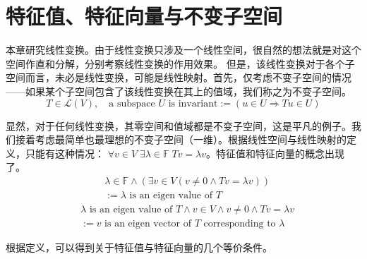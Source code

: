 \documentclass{tufte-book}
\begin{document}
\chapter{特征值、特征向量与不变子空间}
本章研究线性变换。由于线性变换只涉及一个线性空间，很自然的想法就是对这个空间作直和分解，分别考察线性变换的作用效果。
但是，该线性变换对于各个子空间而言，未必是线性变换，可能是线性映射。首先，仅考虑不变子空间的情况——如果某个子空间包含了该线性变换在其上的值域，我们称之为不变子空间。
\[T\in\mathcal{L}(V),\quad \text{a subspace } U\text{ is invariant}:= (u\in U \Rightarrow Tu\in U)\]
\par 显然，对于任何线性变换，其零空间和值域都是不变子空间，这是平凡的例子。我们接着考虑最简单也最理想的不变子空间（一维）。根据线性空间与线性映射的定义，只能有这种情况：
\(\forall v\in V\;\exists\lambda\in\mathbb{F}\;Tv=\lambda v\)。特征值和特征向量的概念出现了。
\[
    \begin{aligned}
         & \lambda \in \mathbb{F}\wedge (\exists v\in V( v\neq 0 \wedge Tv=\lambda v)) \\
         & := \lambda \text{ is an eigen value of }T
    \end{aligned}
\]
\[
    \begin{aligned}
         & \lambda \text{ is an eigen value of }T \wedge v \in V \wedge v \neq 0 \wedge Tv=\lambda v \\
         & := v \text{ is an eigen vector of }T \text{ corresponding to }\lambda
    \end{aligned}
\]
\par 根据定义，可以得到关于特征值与特征向量的几个等价条件。
\end{document}
